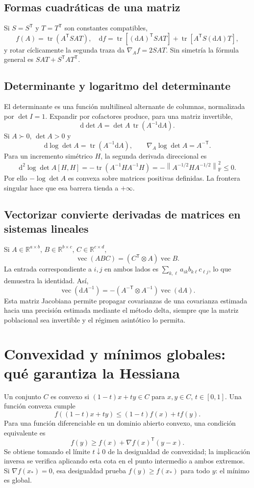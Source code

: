 \documentclass[11pt,a4paper]{article}
\newcommand{\R}{\mathbb R}
\newcommand{\T}{^{\mathsf T}}
\newcommand{\norm}[1]{\left\lVert #1\right\rVert}
\DeclareMathOperator{\tr}{tr}
\newcommand{\F}{_{\mathrm F}}
\theoremstyle{definition}
\begin{document}
\subsection{Formas cuadráticas de una matriz}
Si $S=S\T$ y $T=T\T$ son constantes compatibles,
\[
f(A)=\tr(A\T SAT),\quad
\mathrm df=\tr[(\mathrm dA)\T SAT]+\tr[A\T S(\mathrm dA)T],
\]
y rotar cíclicamente la segunda traza da $\nabla_A f=2SAT$. Sin simetría la fórmula general es $SAT+S\T AT\T$.
\subsection{Determinante y logaritmo del determinante}
El determinante es una función multilineal alternante de columnas, normalizada por $\det I=1$. Expandir por cofactores produce, para una matriz invertible,
\[
\mathrm d\det A=\det A\,\tr(A^{-1}\mathrm dA).
\]
Si $A\succ0$, $\det A>0$ y
\[
\mathrm d\log\det A=\tr(A^{-1}\mathrm dA),\qquad
\nabla_A\log\det A=A^{-\mathsf T}.
\]
Para un incremento simétrico $H$, la segunda derivada direccional es
\[
\mathrm d^2\log\det A[H,H]=-\tr(A^{-1}HA^{-1}H)
=-\norm{A^{-1/2}HA^{-1/2}}\F^2\le0.
\]
Por ello $-\log\det A$ es convexa sobre matrices positivas definidas. La frontera singular hace que esa barrera tienda a $+\infty$.
\subsection{Vectorizar convierte derivadas de matrices en sistemas lineales}
Si $A\in\R^{a\times b}$, $B\in\R^{b\times c}$, $C\in\R^{c\times d}$,
\[
\operatorname{vec}(ABC)=(C\T\otimes A)\operatorname{vec}B.
\]
La entrada correspondiente a $i,j$ en ambos lados es $\sum_{k,\ell}a_{ik}b_{k\ell}c_{\ell j}$, lo que demuestra la identidad. Así,
\[
\operatorname{vec}(\mathrm dA^{-1})
=-(A^{-\mathsf T}\otimes A^{-1})\operatorname{vec}(\mathrm dA).
\]
Esta matriz Jacobiana permite propagar covarianzas de una covarianza estimada hacia una precisión estimada mediante el método delta, siempre que la matriz poblacional sea invertible y el régimen asintótico lo permita.

\section{Convexidad y mínimos globales: qué garantiza la Hessiana}
Un conjunto $C$ es convexo si $(1-t)x+ty\in C$ para $x,y\in C$, $t\in[0,1]$. Una función convexa cumple
\[
f((1-t)x+ty)\le(1-t)f(x)+tf(y).
\]
Para una función diferenciable en un dominio abierto convexo, una condición equivalente es
\[
f(y)\ge f(x)+\nabla f(x)\T(y-x).
\]
Se obtiene tomando el límite $t\downarrow0$ de la desigualdad de convexidad; la implicación inversa se verifica aplicando esta cota en el punto intermedio a ambos extremos. Si $\nabla f(x_*)=0$, esa desigualdad prueba $f(y)\ge f(x_*)$ para todo $y$: el mínimo es global.
\end{document}
